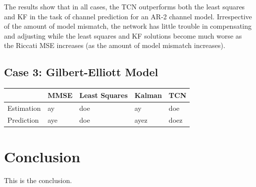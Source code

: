 \documentclass[twocolumn,letterpaper]{IEEEAerospaceCLS}  %
\begin{document}
The results show that in all cases, the TCN outperforms both the least squares and KF in the task of channel prediction for an AR-2 channel model. Irrespective of the amount of model mismatch, the network has little trouble in compensating and adjusting while the least squares and KF solutions become much worse as the Riccati MSE increases (as the amount of model mismatch increases).  

\subsection{Case 3: Gilbert-Elliott Model}

\begin{table}[!h]
\begin{tabular}{|l|l|l|l|l|}
\hline
                            & MMSE                 & Least Squares        & Kalman         & TCN                   \\ \hline
\multirow{3}{*}{Estimation} & \multirow{3}{*}{ay}  & \multirow{3}{*}{doe} & \multirow{3}{*}{ay}   & \multirow{3}{*}{doe}  \\
                            &                      &                      &                       &                       \\
                            &                      &                      &                       &                       \\ \hline
\multirow{3}{*}{Prediction} & \multirow{3}{*}{aye} & \multirow{3}{*}{doe} & \multirow{3}{*}{ayez} & \multirow{3}{*}{doez} \\
                            &                      &                      &                       &                       \\
                            &                      &                      &                       &                       \\ \hline
\end{tabular}
\end{table}


\section{Conclusion}
\label{sec:conclusion}
This is the conclusion.

\end{document}
